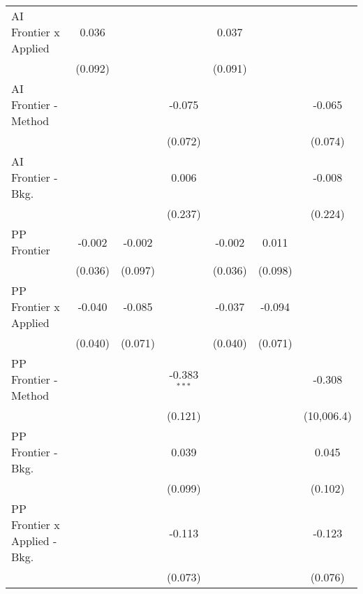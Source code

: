 \begin{tabular}{lcccccc}
   AI Frontier x Applied          & 0.036         &               &                & 0.037          &                &   \\   
                                  & (0.092)       &               &                & (0.091)        &                &   \\   
   AI Frontier - Method           &               &               & -0.075         &                &                & -0.065\\   
                                  &               &               & (0.072)        &                &                & (0.074)\\   
   AI Frontier - Bkg.             &               &               & 0.006          &                &                & -0.008\\   
                                  &               &               & (0.237)        &                &                & (0.224)\\   
   PP Frontier                    & -0.002        & -0.002        &                & -0.002         & 0.011          &   \\   
                                  & (0.036)       & (0.097)       &                & (0.036)        & (0.098)        &   \\   
   PP Frontier x Applied          & -0.040        & -0.085        &                & -0.037         & -0.094         &   \\   
                                  & (0.040)       & (0.071)       &                & (0.040)        & (0.071)        &   \\   
   PP Frontier - Method           &               &               & -0.383$^{***}$ &                &                & -0.308\\   
                                  &               &               & (0.121)        &                &                & (10,006.4)\\   
   PP Frontier - Bkg.             &               &               & 0.039          &                &                & 0.045\\   
                                  &               &               & (0.099)        &                &                & (0.102)\\   
   PP Frontier x Applied - Bkg.   &               &               & -0.113         &                &                & -0.123\\   
                                  &               &               & (0.073)        &                &                & (0.076)\\   

\end{tabular}
